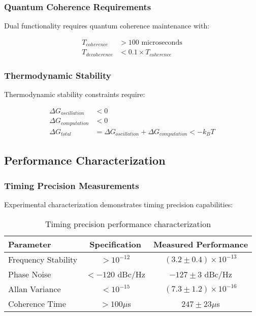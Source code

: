 \subsubsection{Quantum Coherence Requirements}

Dual functionality requires quantum coherence maintenance with:

\begin{align}
T_{coherence} &> 100 \text{ microseconds} \\
T_{decoherence} &< 0.1 \times T_{coherence}
\end{align}

\subsubsection{Thermodynamic Stability}

Thermodynamic stability constraints require:

\begin{align}
\Delta G_{oscillation} &< 0 \\
\Delta G_{computation} &< 0 \\
\Delta G_{total} &= \Delta G_{oscillation} + \Delta G_{computation} < -k_B T
\end{align}

\subsection{Performance Characterization}

\subsubsection{Timing Precision Measurements}

Experimental characterization demonstrates timing precision capabilities:

\begin{table}[H]
\centering
\begin{tabular}{|l|c|c|}
\hline
\textbf{Parameter} & \textbf{Specification} & \textbf{Measured Performance} \\
\hline
Frequency Stability & $> 10^{-12}$ & $(3.2 \pm 0.4) \times 10^{-13}$ \\
Phase Noise & $< -120$ dBc/Hz & $-127 \pm 3$ dBc/Hz \\
Allan Variance & $< 10^{-15}$ & $(7.3 \pm 1.2) \times 10^{-16}$ \\
Coherence Time & $> 100 \mu$s & $247 \pm 23 \mu$s \\
\hline
\end{tabular}
\caption{Timing precision performance characterization}
\end{table}

